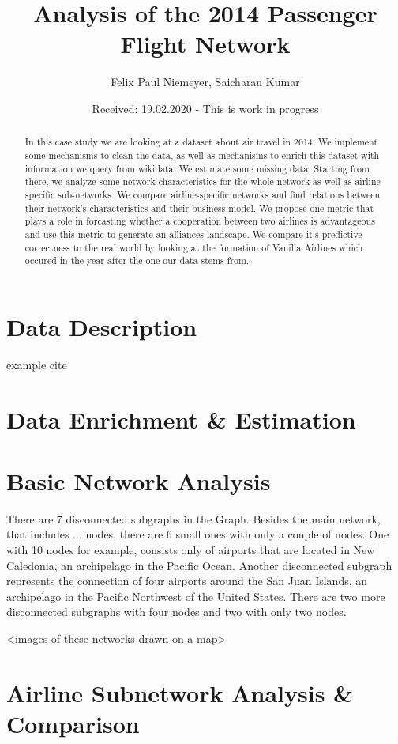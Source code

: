 \documentclass[twocolumn]{tum-article}
\title{Analysis of the 2014 Passenger Flight Network}
\author{Felix Paul Niemeyer\authormark{1},
	Saicharan Kumar\authormark{2}}
\affil[1]{felix.niemeyer@tum.de, MiM}
\affil[2]{saicharan.kumar@tum.de, MiM}
\date{Received: 19.02.2020 - This is work in progress}
\begin{document}
\maketitle

\begin{abstract}
	In this case study we are looking at a dataset about air travel in 2014. We implement some mechanisms to clean the data, as well as mechanisms to enrich this dataset with information we query from wikidata. We estimate some missing data. Starting from there, we analyze some network characteristics for the whole network as well as airline-specific sub-networks. We compare airline-specific networks and find relations between their network's characteristics and their business model. We propose one metric that plays a role in forcasting whether a cooperation between two airlines is advantageous and use this metric to generate an alliances landscape. We compare it's predictive correctness to the real world by looking at the formation of Vanilla Airlines which occured in the year after the one our data stems from. 
\end{abstract}

\section{Data Description}

example cite \cite{jirauschek20141}

\section{Data Enrichment \& Estimation}

\section{Basic Network Analysis}
There are 7 disconnected subgraphs in the Graph.
Besides the main network, that includes ... nodes, there are 6 small ones with only a couple of nodes.
One with 10 nodes for example, consists only of airports that are located in New Caledonia, an archipelago in the Pacific Ocean. 
Another disconnected subgraph represents the connection of four airports around the San Juan Islands, an archipelago in the Pacific Northwest of the United States. There are two more disconnected subgraphs with four nodes and two with only two nodes. 

<images of these networks drawn on a map>

\section{Airline Subnetwork Analysis \& Comparison}
\end{document}
